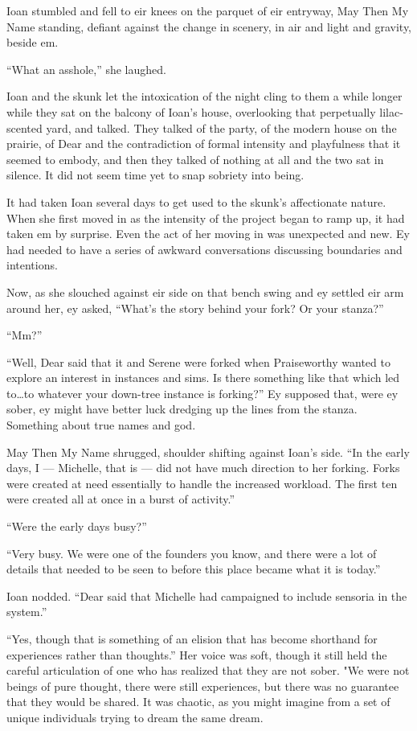 Ioan stumbled and fell to eir knees on the parquet of eir entryway, May Then My Name standing, defiant against the change in scenery, in air and light and gravity, beside em.

``What an asshole,'' she laughed.

Ioan and the skunk let the intoxication of the night cling to them a while longer while they sat on the balcony of Ioan's house, overlooking that perpetually lilac-scented yard, and talked. They talked of the party, of the modern house on the prairie, of Dear and the contradiction of formal intensity and playfulness that it seemed to embody, and then they talked of nothing at all and the two sat in silence. It did not seem time yet to snap sobriety into being.

It had taken Ioan several days to get used to the skunk's affectionate nature. When she first moved in as the intensity of the project began to ramp up, it had taken em by surprise. Even the act of her moving in was unexpected and new. Ey had needed to have a series of awkward conversations discussing boundaries and intentions.

Now, as she slouched against eir side on that bench swing and ey settled eir arm around her, ey asked, ``What's the story behind your fork? Or your stanza?''

``Mm?''

``Well, Dear said that it and Serene were forked when Praiseworthy wanted to explore an interest in instances and sims. Is there something like that which led to\ldots to whatever your down-tree instance is forking?'' Ey supposed that, were ey sober, ey might have better luck dredging up the lines from the stanza. Something about true names and god.

May Then My Name shrugged, shoulder shifting against Ioan's side. ``In the early days, I — Michelle, that is — did not have much direction to her forking. Forks were created at need essentially to handle the increased workload. The first ten were created all at once in a burst of activity.''

``Were the early days busy?''

``Very busy. We were one of the founders you know, and there were a lot of details that needed to be seen to before this place became what it is today.''

Ioan nodded. ``Dear said that Michelle had campaigned to include sensoria in the system.''

``Yes, though that is something of an elision that has become shorthand for experiences rather than thoughts.'' Her voice was soft, though it still held the careful articulation of one who has realized that they are not sober. "We were not beings of pure thought, there were still experiences, but there was no guarantee that they would be shared. It was chaotic, as you might imagine from a set of unique individuals trying to dream the same dream.

